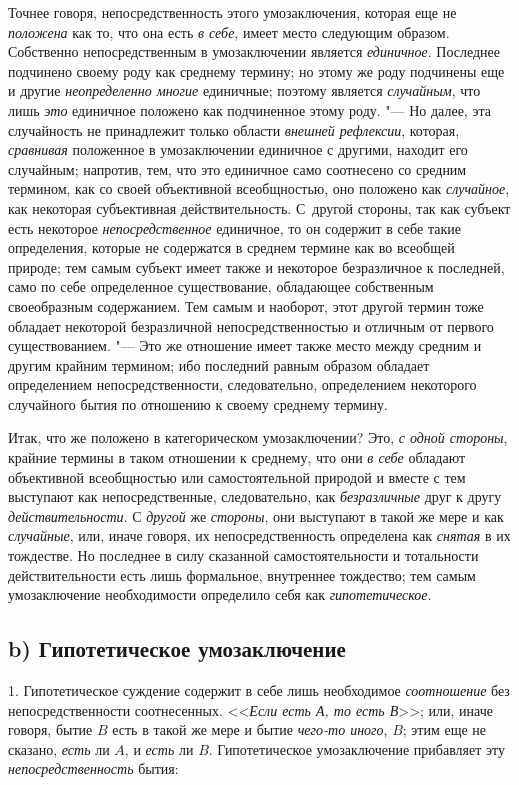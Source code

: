 Точнее говоря, непосредственность этого умозаключения, которая
еще не {\em положена} как
то, что она есть {\em в себе},
имеет место следующим образом. Собственно непосредственным в
умозаключении является {\em единичное}.
Последнее подчинено своему роду как среднему термину; но
этому же роду подчинены еще и другие
{\em неопределенно многие}
единичные; поэтому является
{\em случайным}, что лишь
{\em это} единичное
положено как подчиненное этому роду. "--- Но далее, эта
случайность не принадлежит только области
{\em внешней рефлексии},
которая, {\em сравнивая}
положенное в умозаключении единичное с другими, находит его
случайным; напротив, тем, что это единичное само соотнесено со средним
термином, как со своей объективной всеобщностью, оно положено как
{\em случайное}, как
некоторая субъективная действительность. С~другой стороны, так как субъект
есть некоторое {\em непосредственное}
единичное, то он содержит в себе такие определения, которые
не содержатся в среднем термине как во всеобщей природе; тем самым субъект
имеет также и некоторое безразличное к последней, само по себе определенное
существование, обладающее собственным своеобразным
содержанием. Тем самым и наоборот, этот другой
термин
тоже обладает некоторой безразличной непосредственностью и
отличным от первого существованием. "--- Это же отношение имеет
также место между средним и другим крайним термином; ибо последний равным
образом обладает определением непосредственности, следовательно,
определением некоторого случайного бытия по отношению к своему среднему
термину.

Итак, что же положено в категорическом умозаключении? Это,
{\em с одной стороны},
крайние термины в таком отношении к среднему, что они
{\em в себе} обладают
объективной всеобщностью или самостоятельной природой и вместе с тем
выступают как непосредственные, следовательно, как
{\em безразличные} друг к
другу {\em действительности}.
С {\em другой}
же {\em стороны},
они выступают в такой же мере и как
{\em случайные}, или,
иначе говоря, их непосредственность определена как
{\em снятая} в их
тождестве. Но последнее в силу сказанной самостоятельности и тотальности
действительности есть лишь формальное, внутреннее тождество; тем самым
умозаключение необходимости определило себя как
{\em гипотетическое}.

\subsection[b) Гипотетическое умозаключение]{b) Гипотетическое умозаключение}
1. Гипотетическое суждение содержит в себе лишь необходимое
{\em соотношение} без непосредственности соотнесенных.
<<{\em Если есть А, то есть В}>>; или, иначе говоря, бытие $B$ есть в такой же
мере и бытие {\em чего-то иного}, $B$; этим еще не сказано, {\em есть} ли
$A$, и {\em есть} ли $B$. Гипотетическое умозаключение прибавляет эту
{\em непосредственность} бытия:

